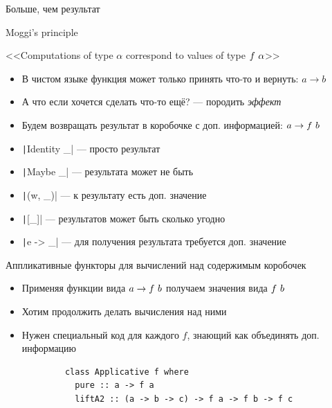     
    \begin{frame}[fragile]{Больше, чем результат}
        \begin{block}{Moggi's principle}
            \begin{center}
                <<Computations of type $\alpha$ correspond to values of type $f~\alpha$>>
            \end{center}
        \end{block}
        \begin{itemize}
            \item В чистом языке функция может только принять что-то и вернуть: $a\to b$
            \item А что если хочется сделать что-то ещё? --- породить \emph{эффект}
            \item Будем возвращать результат в коробочке с доп. информацией: $a\to f~ b$
            \item[\eg] \texttt|Identity _| --- просто результат
            \item[\eg] \texttt|Maybe _| --- результата может не быть
            \item[\eg] \texttt|(w, _)| --- к результату есть доп. значение
            \item[\eg] \texttt|[_]| --- результатов может быть сколько угодно
            \item[\eg] \texttt|e -> _| --- для получения результата требуется доп. значение
        \end{itemize}
    \end{frame}

    \begin{frame}[fragile]{Аппликативные функторы для вычислений над содержимым коробочек}
        \begin{itemize}
            \item Применяя функции вида $a \to f ~ b$ получаем значения вида $f ~ b$
            \item Хотим продолжить делать вычисления над ними
            \item Нужен специальный код для каждого $f$, знающий как объединять доп. информацию
        \end{itemize}
        \pause
        \vspace{0.5em}
        \begin{verbatim}
            class Applicative f where
              pure :: a -> f a
              liftA2 :: (a -> b -> c) -> f a -> f b -> f c
        \end{verbatim}
    \end{frame}
    
